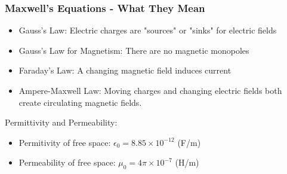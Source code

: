 \documentclass{beamer}
\begin{document}
\begin{frame}\frametitle{Maxwell's Equations - What They Mean}

\begin{itemize}
\item Gauss's Law: Electric charges are "sources" or "sinks" for electric fields
\item Gauss's Law for Magnetism: There are no magnetic monopoles
\item Faraday's Law: A changing magnetic field induces current
\item Ampere-Maxwell Law: Moving charges and changing electric fields both create circulating magnetic fields. 
\end{itemize}

\vspace{1cm}

Permittivity and Permeability:
\begin{itemize}
\item Permitivity of free space: $\epsilon_0 = 8.85 \times 10^{-12}$ (F/m)
\item Permeability of free space: $\mu_{0} = 4 \pi \times 10^{-7}$ (H/m)
\end{itemize}

\end{frame}
\end{document}
